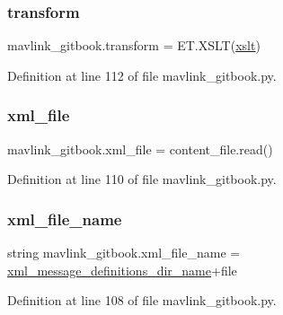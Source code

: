 \subsubsection{\texorpdfstring{transform}{transform}}
{\footnotesize\ttfamily mavlink\+\_\+gitbook.\+transform = E\+T.\+X\+S\+LT(\mbox{\hyperlink{namespacemavlink__gitbook_a6fdcf2e9551166072265847a9efbcc9b}{xslt}})}



Definition at line 112 of file mavlink\+\_\+gitbook.\+py.

\mbox{\label{namespacemavlink__gitbook_ac775536f765d6de771c4504a54332d8b}} 
\subsubsection{\texorpdfstring{xml\_file}{xml\_file}}
{\footnotesize\ttfamily mavlink\+\_\+gitbook.\+xml\+\_\+file = content\+\_\+file.\+read()}



Definition at line 110 of file mavlink\+\_\+gitbook.\+py.

\mbox{\label{namespacemavlink__gitbook_a290dd8831d31b5ea4959bbd4232dc591}} 
\subsubsection{\texorpdfstring{xml\_file\_name}{xml\_file\_name}}
{\footnotesize\ttfamily string mavlink\+\_\+gitbook.\+xml\+\_\+file\+\_\+name = \mbox{\hyperlink{namespacemavlink__gitbook_a77eba659d76a13449029b543069e297a}{xml\+\_\+message\+\_\+definitions\+\_\+dir\+\_\+name}}+file}



Definition at line 108 of file mavlink\+\_\+gitbook.\+py.

\mbox{\label{namespacemavlink__gitbook_a77eba659d76a13449029b543069e297a}} 
